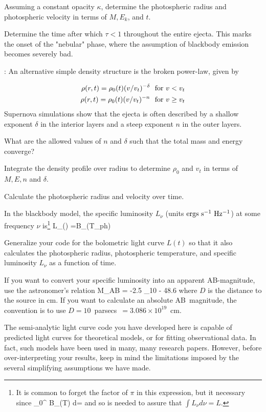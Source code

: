 \documentclass{tufte-handout}
\begin{document}
 Assuming a constant opacity $\kappa$, determine the photospheric radius and photospheric velocity in terms of $M, E_k$, and $t$. 

 Determine the time after which $\tau < 1$ throughout the entire ejecta. This marks the onset of the "nebular" phase, where the assumption of blackbody emission becomes severely bad.

\bigskip {}: An alternative simple density structure is the broken power-law, given by

\begin{eqnarray}
\rho(r,t) = \rho_0(t) (v/v_t)^{-\delta}~~{\rm for~} v < v_t
 \\
\rho(r,t) = \rho_0(t) (v/v_t)^{-n}~~ {\rm for~} v \geq v_t
\end{eqnarray}
Supernova simulations show that the ejecta is often described by a shallow
exponent $\delta$ in the interior layers and a steep exponent $n$ in the outer layers.

 What are the allowed values of $n$ and $\delta$ such that the total mass and energy converge? 


 Integrate the density profile over radius to determine $\rho_0$ and $v_t$ in terms of
 $M,E, n$ and $\delta$. 

 Calculate the photospheric radius and velocity over time.



\pp In the blackbody model, the specific luminosity $L_\nu$ (units 
${\rm ergs~s^{-1}~Hz^{-1}}$) at some frequency $\nu$ is\footnote{It is common to forget
the factor of $\pi$ in this expression, but it necessary since 
\beq
\int_{0}^{\infty} B_\nu(T) d\nu = 
\eeq
and so is needed to assure that $\int L_\nu d\nu = L$. }
\beq
L_\nu(\nu) =B_\nu(T_{\rm ph})  
\eeq

 Generalize your code for the bolometric light curve $L(t)$ so that it also  calculates the photospheric radius, photospheric temperature, and specific luminosity $L_\nu$ as a function of time.  

\comment If you want to convert your specific luminosity into an apparent AB-magnitude, use the
astronomer's relation
\beq
M_{\rm AB} = -2.5 \log_{10}  - 48.6
\eeq
where $D$ is the distance to the source in cm. If you want to calculate an absolute
AB~magnitude, the convention is to use $D = 10$~parsecs~$= 3.086 \times 10^{19}$~cm.

\comment The semi-analytic light curve code you have developed here is capable of 
predicted light curves for theoretical models, or for fitting observational data.
In fact, such models have been used in many, many research papers. However, before over-interpreting your results, keep in mind the limitations imposed by the several simplifying assumptions we have made.
\end{document}
